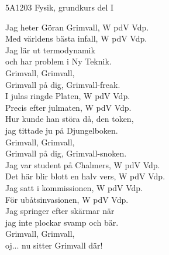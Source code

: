 \documentclass[a6paper,10pt]{article}
\begin{document}
\setlength{\oddsidemargin}{-0.37in}
\noindent
\begin{center}
\footnotesize5A1203 Fysik, grundkurs del I\\
\end{center}
\begin{lyrics}
Jag heter Göran Grimvall, W pdV Vdp. \\
Med världens bästa infall, W pdV Vdp. \\
Jag lär ut termodynamik \\
och har problem i Ny Teknik. \\
Grimvall, Grimvall, \\
Grimvall på dig, Grimvall-freak. 
\vspace{5pt} \\
I julas ringde Platen, W pdV Vdp. \\
Precis efter julmaten, W pdV Vdp. \\
Hur kunde han störa då, den token, \\
jag tittade ju på Djungelboken. \\
Grimvall, Grimvall, \\
Grimvall på dig, Grimvall-snoken. 
\vspace{5pt} \\
Jag var student på Chalmers, W pdV Vdp. \\
Det här blir blott en halv vers, W pdV Vdp. 
\vspace{5pt} \\
Jag satt i kommissionen, W pdV Vdp. \\
För ubåtsinvasionen, W pdV Vdp. \\
Jag springer efter skärmar när \\
jag inte plockar svamp och bär. 
\vspace{5pt} \\
Grimvall, Grimvall,\\
 oj... nu sitter Grimvall där! 
\end{lyrics}
\end{document}
